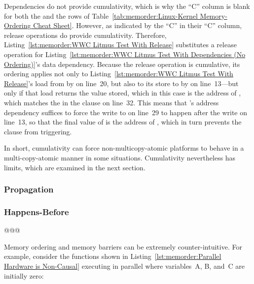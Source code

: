 Dependencies do not provide cumulativity,
which is why the ``C'' column is blank for
both the  and the  rows
of Table~\ref{tab:memorder:Linux-Kernel Memory-Ordering Cheat Sheet}.
However, as indicated by the ``C'' in their ``C'' column,
release operations do provide cumulativity.
Therefore,
Listing~\ref{lst:memorder:WWC Litmus Test With Release}
substitutes a release operation for
Listing~\ref{lst:memorder:WWC Litmus Test With Dependencies (No Ordering)}'s
data dependency.
Because the release operation is cumulative, its ordering applies not only to
Listing~\ref{lst:memorder:WWC Litmus Test With Release}'s
load from  by  on line~20, but also to its store to 
by  on line~13---but only if that load returns the value stored,
which in this case is the address of , which matches the 
in the  clause on line~32.
This means that 's address dependency suffices to force the
write to  on line~29 to happen after the write on line~13, so
that the final value of  is the address of , which
in turn prevents the  clause from triggering.

In short, cumulativity can force non-multicopy-atomic platforms to
behave in a multi-copy-atomic manner in some situations.
Cumulativity nevertheless has limits, which are examined in the next section.

\subsubsection{Propagation}
\label{sec:memorder:Propagation}



\subsubsection{Happens-Before}
\label{sec:memorder:Happens-Before}


@@@

Memory ordering and memory barriers can be extremely counter-intuitive.
For example, consider the functions shown in
Listing~\ref{lst:memorder:Parallel Hardware is Non-Causal}
executing in parallel
where variables~A, B, and~C are initially zero:

